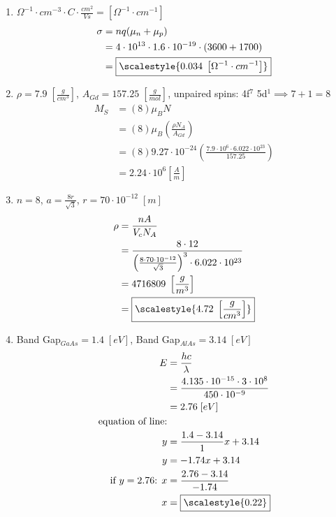 \documentclass[11pt]{article}
\newcommand{\scalemath}[1]%
{\mathchoice{\scalestyle{\displaystyle #1}}%
            {\scalestyle{\textstyle #1}}%
            {\scalestyle{\scriptstyle #1}}%
            {\scalestyle{\scriptscriptstyle #1}}%
}
\begin{document}
{\begin{enumerate}
    \item $\Omega^{-1}\cdot cm^{-3}\cdot C\cdot \frac{cm^2}{Vs}=\left[\Omega^{-1}\cdot cm^{-1}\right]$
    \begin{align*}
        \sigma&=nq(\mu_n+\mu_p)\\
        &=4\cdot10^{13}\cdot1.6\cdot10^{-19}\cdot(3600+1700)\\
        &=\fbox{$\displaystyle\scalemath{0.034\;\left[\Omega^{-1}\cdot cm^{-1}\right]}$}
    \end{align*}
    
    \item $\rho=7.9\;\left[\frac{g}{cm^3}\right]$, $A_{Gd}=157.25\;\left[\frac{g}{mol}\right]$, unpaired spins: 4f$^7$ 5d$^1\implies7+1=8$
    \begin{align*}
        M_S&=(8)\mu_B N\\
        &=(8)\mu_B\left(\frac{\rho N_A}{A_{Gd}}\right)\\
        &=(8)9.27\cdot10^{-24}\left(\frac{7.9\cdot10^6\cdot6.022\cdot10^{23}}{157.25}\right)\\
        &=2.24\cdot10^6 \left[\frac{A}{m}\right]
    \end{align*}
    
    \item $n=8$, $a=\frac{8r}{\sqrt3}$, $r=70\cdot10^{-12}\;[m]$
    \begin{align*}
        \rho&=\frac{nA}{V_cN_A}\\
        &=\frac{8\cdot12}{\left(\frac{8\cdot70\cdot10^{-12}}{\sqrt3}\right)^3\cdot6.022\cdot10^{23}}\\
        &=4716809\;\left[\frac{g}{m^3}\right]\\
        &=\fbox{$\displaystyle\scalemath{4.72\;\left[\frac{g}{cm^3}\right]}$}
    \end{align*}
    
    \item Band Gap$_{GaAs}=1.4\;[eV]$, Band Gap$_{AlAs}=3.14\;[eV]$
    \begin{align*}
        E&=\frac{hc}{\lambda}\\
        &=\frac{4.135\cdot10^{-15}\cdot3\cdot10^8}{450\cdot10^{-9}}\\
        &=2.76\;[eV]\\
        \text{equation of line:}\\
        y&=\frac{1.4-3.14}{1}x+3.14\\
        y&=-1.74x+3.14\\
        \text{if $y=2.76$: } x&=\frac{2.76-3.14}{-1.74}\\
        x&=\fbox{$\displaystyle\scalemath{0.22}$}
    \end{align*}
\end{enumerate}
}
\end{document}
